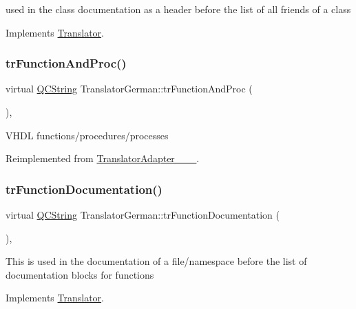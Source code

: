 used in the class documentation as a header before the list of all friends of a class 

Implements \mbox{\hyperlink{class_translator}{Translator}}.

\mbox{\label{class_translator_german_a9e88578f6b520c4dfad3cf6df094f728}} 
\subsubsection{\texorpdfstring{trFunctionAndProc()}{trFunctionAndProc()}}
{\footnotesize\ttfamily virtual \mbox{\hyperlink{class_q_c_string}{Q\+C\+String}} Translator\+German\+::tr\+Function\+And\+Proc (\begin{DoxyParamCaption}{ }\end{DoxyParamCaption})\hspace{0.3cm}{\ttfamily [inline]}, {\ttfamily [virtual]}}

V\+H\+DL functions/procedures/processes 

Reimplemented from \mbox{\hyperlink{class_translator_adapter__1__8__15}{Translator\+Adapter\+\_\+\_\+\_}}.

\mbox{\label{class_translator_german_acb7e8b30b5d65ade78a29c8cfe45daea}} 
\subsubsection{\texorpdfstring{trFunctionDocumentation()}{trFunctionDocumentation()}}
{\footnotesize\ttfamily virtual \mbox{\hyperlink{class_q_c_string}{Q\+C\+String}} Translator\+German\+::tr\+Function\+Documentation (\begin{DoxyParamCaption}{ }\end{DoxyParamCaption})\hspace{0.3cm}{\ttfamily [inline]}, {\ttfamily [virtual]}}

This is used in the documentation of a file/namespace before the list of documentation blocks for functions 

Implements \mbox{\hyperlink{class_translator}{Translator}}.


